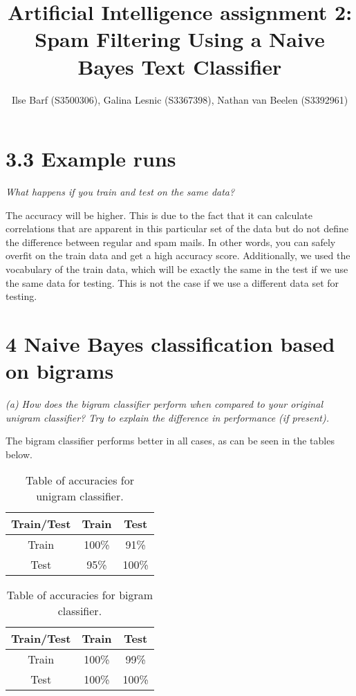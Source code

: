 \documentclass{article}
\title{Artificial Intelligence assignment 2: Spam Filtering Using a Naive Bayes Text Classifier}
\author{Ilse Barf (S3500306), Galina Lesnic (S3367398), Nathan van Beelen (S3392961)}
\begin{document}
\maketitle

\section*{3.3 Example runs}
\textit{What happens if you train and test on the same data?}

The accuracy will be higher. This is due to the fact that it can calculate
correlations that are apparent in this particular set of the data but do not
define the difference between regular and spam mails. In other words, you can
safely overfit on the train data and get a high accuracy score. Additionally,
we used the vocabulary of the train data, which will be exactly the same in the
test if we use the same data for testing. This is not the case if we use a
different data set for testing.

\section*{4 Naive Bayes classification based on bigrams}

\textit{(a) How does the bigram classifier perform when compared to your original unigram classifier? Try to explain the difference in performance (if present).}

The bigram classifier performs better in all cases, as can be seen in the tables below.
\begin{table}[h]
    \centering
    \begin{tabular}{c|c c}
        Train/Test &Train&Test  \\
        \hline
        Train & 100\% & 91\% \\
        Test & 95\% & 100\%
    \end{tabular}
    \caption{Table of accuracies for unigram classifier.}
    \label{tab:my_label}
\end{table}

\begin{table}[h]
    \centering
    \begin{tabular}{c|c c}
        Train/Test &Train&Test  \\
        \hline
        Train& 100\%& 99\% \\
        Test & 100\% & 100\%
    \end{tabular}
    \caption{Table of accuracies for bigram classifier.}
    \label{tab:my_label}
\end{table}
\end{document}
